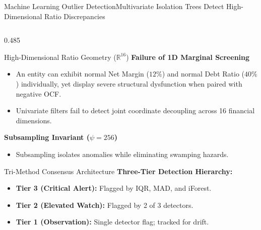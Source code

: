 \begin{frame}{Machine Learning Outlier Detection}{Multivariate Isolation Trees Detect High-Dimensional Ratio Discrepancies}
    \vspace{-0.20cm}
    \begin{columns}[T,onlytextwidth]
        \begin{column}{0.485\textwidth}
            \begin{quantcard}[height=2.74cm]{High-Dimensional Ratio Geometry ($\mathbb{R}^{16}$)}
                \fontsize{5.7pt}{6.9pt}\selectfont
                \textbf{\color{deepemerald}Failure of 1D Marginal Screening}
                \begin{itemize}
                    \setlength{\itemsep}{0.8pt}
                    \item An entity can exhibit normal Net Margin ($12\%$) and normal Debt Ratio ($40\%$) individually, yet display severe structural dysfunction when paired with negative OCF.
                    \item Univariate filters fail to detect joint coordinate decoupling across 16 financial dimensions.
                \end{itemize}
                \textbf{\color{deepemerald}Subsampling Invariant ($\psi = 256$)}
                \begin{itemize}
                    \setlength{\itemsep}{0.5pt}
                    \item Subsampling isolates anomalies while eliminating swamping hazards.
                \end{itemize}
            \end{quantcard}

            \vspace{0.12cm}

            \begin{quantcard}[height=2.74cm]{Tri-Method Consensus Architecture}
                \fontsize{5.4pt}{6.6pt}\selectfont
                \textbf{\color{deepemerald}Three-Tier Detection Hierarchy:}
                \begin{itemize}
                    \setlength{\itemsep}{0.2pt}
                    \setlength{\topsep}{1pt}
                    \item \textbf{Tier 3 (Critical Alert):} Flagged by IQR, MAD, and iForest.
                    \item \textbf{Tier 2 (Elevated Watch):} Flagged by 2 of 3 detectors.
                    \item \textbf{Tier 1 (Observation):} Single detector flag; tracked for drift.
                \end{itemize}
                \vspace{2pt}
            \end{quantcard}
        \end{column}


\end{columns}
\end{frame}
